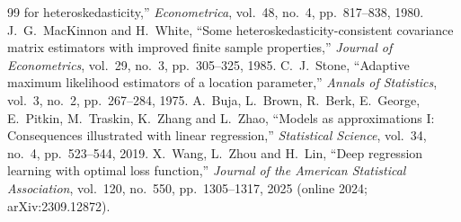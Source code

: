 \documentclass[11pt]{article}
\numberwithin{figure}{section}
\numberwithin{equation}{section}
\begin{document}
\begin{thebibliography}{99}
  for heteroskedasticity,'' \emph{Econometrica}, vol.~48, no.~4, pp.~817--838, 1980.
 J.~G.~MacKinnon and H.~White, ``Some heteroskedasticity-consistent covariance matrix
  estimators with improved finite sample properties,'' \emph{Journal of Econometrics}, vol.~29, no.~3,
  pp.~305--325, 1985.
 C.~J.~Stone, ``Adaptive maximum likelihood estimators of a location parameter,''
  \emph{Annals of Statistics}, vol.~3, no.~2, pp.~267--284, 1975.
 A.~Buja, L.~Brown, R.~Berk, E.~George, E.~Pitkin, M.~Traskin, K.~Zhang and L.~Zhao, ``Models as
  approximations I: Consequences illustrated with linear regression,'' \emph{Statistical Science}, vol.~34,
  no.~4, pp.~523--544, 2019.
 X.~Wang, L.~Zhou and H.~Lin, ``Deep regression learning with optimal loss function,'' \emph{Journal of the American Statistical Association}, vol.~120, no.~550, pp.~1305--1317, 2025 (online 2024; arXiv:2309.12872).
\end{thebibliography}
\end{document}
